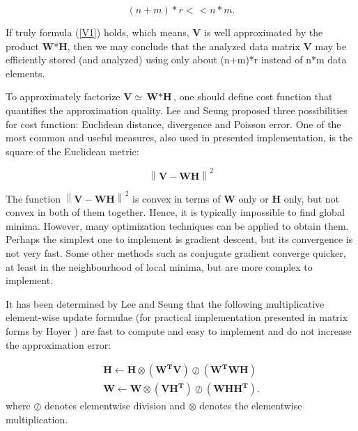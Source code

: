 \documentclass[journal]{IEEEtran}
\newcommand{\beq}{\begin{equation}}
\newcommand{\eeq}{\end{equation}}
\newcommand{\norm}[1]{\left\lVert#1\right\rVert}
\begin{document}
\begin{equation}\label{r1}
    (n+m)*r<\hspace{1pt}< n*m .
\end{equation}

If truly formula (\ref{V1}) holds, which means, {\bf V} is well
approximated by the product {\bf W}*{\bf H}, then we may conclude that the
analyzed data matrix {\bf V} may be efficiently stored (and analyzed)
using only about (n+m)*r instead of n*m data elements.

To approximately factorize $\textbf{V}\simeq{\textbf{W}*\textbf{H}}$, one should define cost function that quantifies the approximation quality. Lee and Seung proposed three possibilities for cost function: Euclidean distance, divergence and Poisson error. One of the most common and useful measures, also used in presented implementation, is the square of the Euclidean metric:

\beq
\norm{\textbf{V}-\textbf{WH}}^2
\eeq

The function $\norm{\textbf{V}-\textbf{WH}}^2$ is convex in terms of \textbf{W} only or \textbf{H} only, but not convex in both of them together. Hence, it is typically impossible to find global minima. However, many optimization techniques can be applied to obtain them.
Perhaps the simplest one to implement is gradient descent, but its convergence is not very fast. Some other methods such as conjugate gradient converge quicker, at least in the neighbourhood of local minima, but are more complex to implement.

It has been determined by Lee and Seung that the following multiplicative element-wise update formulae (for practical implementation presented in matrix forms by Hoyer \cite{hoyer2004non}) are fast to compute and easy to implement %
and do not increase the approximation error:

\begin{equation}
\begin{array}{ll}
     &\mathbf{H} \leftarrow \mathbf{H}\otimes(\mathbf{W^TV})\oslash
(\mathbf{W^TWH}) \quad  \\
     & \mathbf{W} \leftarrow \mathbf{W}\otimes(\mathbf{VH^T})\oslash(\mathbf{WHH^T}).
\end{array}
\end{equation}
where $\oslash
$ denotes elementwise division and $\otimes$ denotes the elementwise multiplication. 
\end{document}
